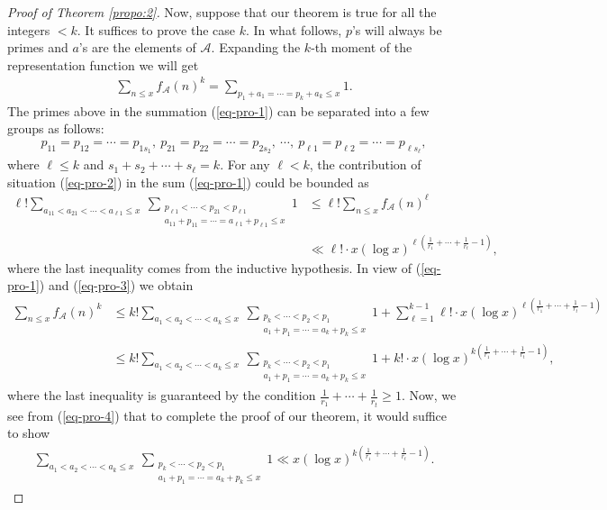 \documentclass[12pt,a4paper,reqno]{amsart}
\numberwithin{equation}{section}
\theoremstyle{plain}
\theoremstyle{definition}
\begin{document}
\begin{proof}[Proof of Theorem \ref{propo:2}]
Now, suppose that our theorem is true for all the integers $<k$. It suffices to prove the case $k$. In what follows, $p$'s will always be primes and $a$'s  are the elements of $\mathcal{A}$. Expanding the $k$-th moment of the representation function we will get
\begin{align}\label{eq-pro-1}
\sum_{n\le x}f_{\mathcal{A}}(n)^k=\sum_{p_1+a_1=\cdots=p_k+a_k\le x}1.
\end{align}
The primes above in the summation (\ref{eq-pro-1}) can be separated into a few groups as follows:
\begin{align}\label{eq-pro-2}
p_{11}=p_{12}=\cdots=p_{1s_1},\ p_{21}=p_{22}=\cdots=p_{2s_2},\ \cdots,\ p_{\ell1}=p_{\ell2}=\cdots=p_{\ell s_\ell},
\end{align}
where $\ell\le k$ and $s_1+s_2+\cdots+s_\ell=k$. For any $\ell<k$, the contribution of situation (\ref{eq-pro-2}) in the sum (\ref{eq-pro-1}) could be bounded as 
\begin{align}\label{eq-pro-3}
\ell !\sum_{a_{11}<a_{21}<\cdots<a_{\ell 1}\le x}~\sum_{\substack{p_{\ell1}<\cdots<p_{21}<p_{\ell 1}\\a_{11}+p_{11}=\cdots=a_{\ell 1}+p_{\ell 1}\le x}}1&\le \ell !\sum_{n\le x}f_{\mathcal{A}}(n)^\ell\nonumber\\
&\ll \ell! \cdot x (\log x)^{\ell \left(\frac{1}{r_1}+\cdots+\frac{1}{r_t}-1\right)},
\end{align}
where the last inequality comes from the inductive hypothesis. In view of (\ref{eq-pro-1}) and (\ref{eq-pro-3}) we obtain
\begin{align}\label{eq-pro-4}
\sum_{n\le x}f_{\mathcal{A}}(n)^k&\le k! \sum_{a_{1}<a_{2}<\cdots<a_{k}\le x}~\sum_{\substack{p_{k}<\cdots<p_{2}<p_{1}\\a_{1}+p_{1}=\cdots=a_{k}+p_{k}\le x}}1+\sum_{\ell=1}^{k-1}\ell! \cdot x (\log x)^{\ell \left(\frac{1}{r_1}+\cdots+\frac{1}{r_t}-1\right)}\nonumber\\
&\le k! \sum_{a_{1}<a_{2}<\cdots<a_{k}\le x}~\sum_{\substack{p_{k}<\cdots<p_{2}<p_{1}\\a_{1}+p_{1}=\cdots=a_{k}+p_{k}\le x}}1+k!\cdot x (\log x)^{k\left(\frac{1}{r_1}+\cdots+\frac{1}{r_t}-1\right)},
\end{align}
where the last inequality is guaranteed by the condition $\frac{1}{r_1}+\cdots+\frac{1}{r_t}\ge 1$.
Now, we see from (\ref{eq-pro-4}) that to complete the proof of our theorem, it would suffice to show
\begin{align}\label{eq-pro-5}
\sum_{a_{1}<a_{2}<\cdots<a_{k}\le x}~\sum_{\substack{p_{k}<\cdots<p_{2}<p_{1}\\a_{1}+p_{1}=\cdots=a_{k}+p_{k}\le x}}1\ll x (\log x)^{k\left(\frac{1}{r_1}+\cdots+\frac{1}{r_t}-1\right)}.
\end{align}


\end{proof}
\end{document}

